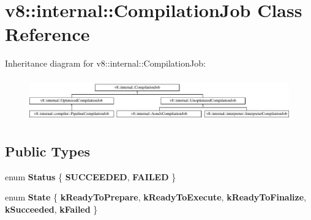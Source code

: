 \hypertarget{classv8_1_1internal_1_1CompilationJob}{}\section{v8\+:\+:internal\+:\+:Compilation\+Job Class Reference}
\label{classv8_1_1internal_1_1CompilationJob}
Inheritance diagram for v8\+:\+:internal\+:\+:Compilation\+Job\+:\begin{figure}[H]
\begin{center}
\leavevmode
\includegraphics[height=1.879195cm]{classv8_1_1internal_1_1CompilationJob}
\end{center}
\end{figure}
\subsection*{Public Types}
\begin{DoxyCompactItemize}
\item 
\mbox{\label{classv8_1_1internal_1_1CompilationJob_a5139448eb71cada82780ab292fe35e9e}} 
enum {\bfseries Status} \{ {\bfseries S\+U\+C\+C\+E\+E\+D\+ED}, 
{\bfseries F\+A\+I\+L\+ED}
 \}
\item 
\mbox{\label{classv8_1_1internal_1_1CompilationJob_a3afd0efea3b42e5d02bad3ced82af814}} 
enum {\bfseries State} \{ \newline
{\bfseries k\+Ready\+To\+Prepare}, 
{\bfseries k\+Ready\+To\+Execute}, 
{\bfseries k\+Ready\+To\+Finalize}, 
{\bfseries k\+Succeeded}, 
\newline
{\bfseries k\+Failed}
 \}
\end{DoxyCompactItemize}
